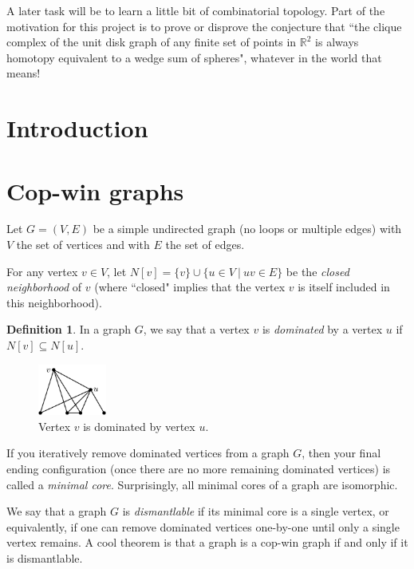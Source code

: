 \documentclass[amscd, amssymb, verbatim]{amsart}[12pt]
\theoremstyle{plain}
\theoremstyle{definition}
\newtheorem{definition}[lemma]{Definition}
\newcommand{\R}{\mathbb{R}}
\begin{document}
A later task will be to learn a little bit of combinatorial topology.
Part of the motivation for this project is to prove or disprove the conjecture that ``the clique complex of the unit disk graph of any finite set of points in $\R^2$ is always homotopy equivalent to a wedge sum of spheres", whatever in the world that means!

\section{Introduction}

\section{Cop-win graphs}\label{sec:cop-win}

Let $G=(V,E)$ be a simple undirected graph (no loops or multiple edges) with $V$ the set of vertices and with $E$ the set of edges.

For any vertex $v\in V$, let $N[v]=\{v\}\cup\{u\in V~|~uv\in E\}$ be the \emph{closed neighborhood} of $v$ (where ``closed" implies that the vertex $v$ is itself included in this neighborhood).
\begin{definition}\label{def:dominated}
In a graph $G$, we say that a vertex $v$ is \emph{dominated} by a vertex $u$ if $N[v]\subseteq N[u]$.
\end{definition}

\begin{figure}[h]
\centering
\includegraphics[width=0.2\textwidth]{Dominated1_labeled.pdf}
\caption{Vertex $v$ is dominated by vertex $u$.}
\label{fig:dominated}
\end{figure}


If you iteratively remove dominated vertices from a graph $G$, then your final ending configuration (once there are no more remaining dominated vertices) is called a \emph{minimal core}.
Surprisingly, all minimal cores of a graph are isomorphic.

We say that a graph $G$ is \emph{dismantlable} if its minimal core is a single vertex, or equivalently, if one can remove dominated vertices one-by-one until only a single vertex remains.
A cool theorem is that a graph is a cop-win graph if and only if it is dismantlable.
\end{document}
